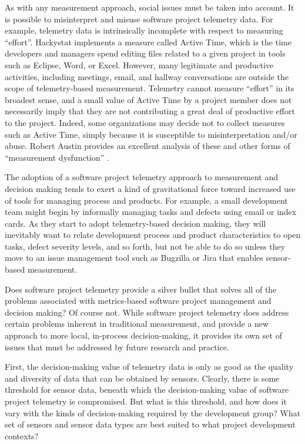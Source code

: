 \documentclass[11pt,twocolumn]{article}
\begin{document}
As with any measurement approach, social issues must be taken into
account. It is possible to misinterpret and misuse software project
telemetry data. For example, telemetry data is intrinsically incomplete
with respect to measuring ``effort''.  Hackystat implements a measure
called Active Time, which is the time developers and managers spend editing
files related to a given project in tools such as Eclipse, Word, or
Excel. However, many legitimate and productive activities, including
meetings, email, and hallway conversations are outside the scope of
telemetry-based measurement. Telemetry cannot measure ``effort'' in its
broadest sense, and a small value of Active Time by a project member does
not necessarily imply that they are not contributing a great deal of
productive effort to the project.  Indeed, some organizations may decide
not to collect measures such as Active Time, simply because it is
susceptible to misinterpretation and/or abuse.  Robert Austin provides
an excellent analysis of these and other forms of ``measurement dysfunction'' \cite{Austin96}. 


The adoption of a software project telemetry approach to measurement and
decision making tends to exert a kind of gravitational force toward
increased use of tools for managing process and products. For example, a
small development team might begin by informally managing tasks and defects
using email or index cards.  As they start to adopt telemetry-based
decision making, they will inevitably want to relate development process
and product characteristics to open tasks, defect severity levels, and so
forth, but not be able to do so unless they move to an issue management
tool such as Bugzilla or Jira that enables sensor-based measurement.



Does software project telemetry provide a silver bullet that solves all of
the problems associated with metrics-based software project management and
decision making?  Of course not.  While software project telemetry does
address certain problems inherent in traditional measurement, and provide a
new approach to more local, in-process decision-making, it provides its own
set of issues that must be addressed by future research and practice.

First, the decision-making value of telemetry data is only as good as the
quality and diversity of data that can be obtained by sensors. Clearly,
there is some threshold for sensor data, beneath which the decision-making
value of software project telemetry is compromised. But what is this
threshold, and how does it vary with the kinds of decision-making required
by the development group?  What set of sensors and sensor data types are
best suited to what project development contexts?
\end{document}
